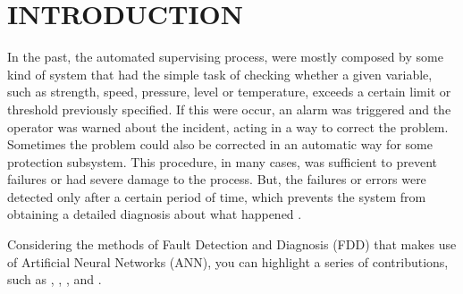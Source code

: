 \documentclass[10pt,fleqn,a4paper]{article}
\begin{document}
\section{INTRODUCTION}
In the past, the automated supervising process, were mostly composed by some
kind of system that had the simple task of checking whether a given variable,
such as strength, speed, pressure, level or temperature, exceeds a certain limit
or threshold previously specified. If this were occur, an alarm was triggered
and the operator was warned about the incident, acting in a way to correct the
problem. Sometimes the problem could also be corrected in an automatic way for
some protection subsystem. This procedure, in many cases, was sufficient to
prevent failures or had severe damage to the process. But, the failures or
errors were detected only after a certain period of time, which prevents the
system from obtaining a detailed diagnosis about what happened
\citep{isermann:2006}.

Considering the methods of Fault Detection and Diagnosis (FDD) that makes use of
Artificial Neural Networks (ANN), you can highlight a series of contributions,
such as \citet{sreedhar:1995}, \citet{vemuri:1998}, \citet{chang:2003},
\citet{talebi:2005} and \citet{jia-li:2010}.

\end{document}
